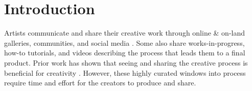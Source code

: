 \section{Introduction} %


Artists communicate and share their creative work through online \& on-land galleries, communities, and social media \cite{Kim2017}. Some also share works-in-progress, how-to tutorials, and videos describing the process that leads them to a final product. Prior work has shown that seeing and sharing the creative process is beneficial for creativity \cite{Kim2017}. However, these highly curated windows into process require time and effort for the creators to produce and share. 


